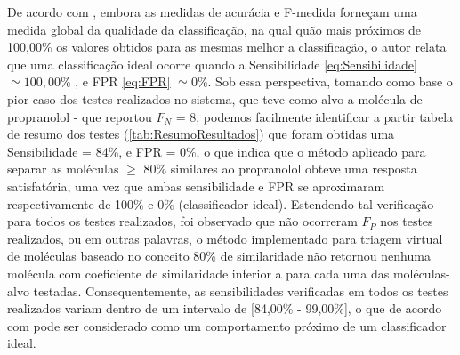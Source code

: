 De acordo com , embora as medidas de acurácia e F-medida forneçam uma medida global da qualidade da classificação, na qual quão mais próximos de 100,00\% os valores obtidos para as mesmas melhor a classificação, o autor relata que uma classificação ideal ocorre quando a Sensibilidade \eqref{eq:Sensibilidade} $\simeq 100,00$\% , e FPR \eqref{eq:FPR}  $\simeq 0$\%. Sob essa perspectiva, tomando como base o pior caso dos testes realizados no sistema, que teve como alvo a molécula de propranolol - que reportou $F_N$ = 8, podemos facilmente identificar a partir tabela de resumo dos testes (\ref{tab:ResumoResultados}) que foram obtidas uma Sensibilidade = 84\%, e FPR = 0\%, o que indica que o método aplicado para separar as moléculas $\geq$ 80\% similares ao propranolol obteve uma resposta satisfatória, uma vez que ambas sensibilidade e FPR se aproximaram respectivamente de 100\% e 0\% (classificador ideal). Estendendo tal verificação para todos os testes realizados, foi observado que não ocorreram $F_P$ nos testes realizados, ou em outras palavras, o método  implementado para triagem virtual de moléculas baseado no conceito 80\% de  similaridade não retornou nenhuma molécula com coeficiente de similaridade inferior a  para cada uma das moléculas-alvo testadas. Consequentemente, as sensibilidades verificadas em todos os testes realizados variam dentro de um intervalo de [84,00\% - 99,00\%], o que de acordo com   pode ser considerado como um comportamento próximo de um classificador ideal.




            


   

   
